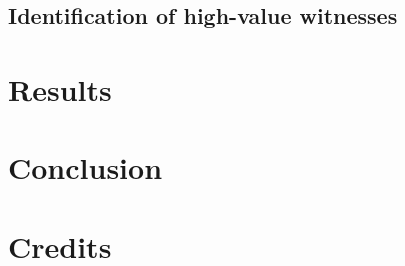 \documentclass[]{article}
\begin{document}
\hypertarget{identification-of-high-value-witnesses}{%
\subsection{Identification of high-value
witnesses}\label{identification-of-high-value-witnesses}}

\hypertarget{results}{%
\section{Results}\label{results}}

\hypertarget{conclusion}{%
\section{Conclusion}\label{conclusion}}

\hypertarget{credits}{%
\section{Credits}\label{credits}}
\end{document}
